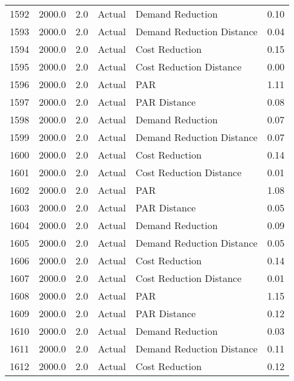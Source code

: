 \begin{longtable}{lrrllr}
1592 &       2000.0 &     2.0 &         Actual &           Demand Reduction &   0.10 \\
1593 &       2000.0 &     2.0 &         Actual &  Demand Reduction Distance &   0.04 \\
1594 &       2000.0 &     2.0 &         Actual &             Cost Reduction &   0.15 \\
1595 &       2000.0 &     2.0 &         Actual &    Cost Reduction Distance &   0.00 \\
1596 &       2000.0 &     2.0 &         Actual &                        PAR &   1.11 \\
1597 &       2000.0 &     2.0 &         Actual &               PAR Distance &   0.08 \\
1598 &       2000.0 &     2.0 &         Actual &           Demand Reduction &   0.07 \\
1599 &       2000.0 &     2.0 &         Actual &  Demand Reduction Distance &   0.07 \\
1600 &       2000.0 &     2.0 &         Actual &             Cost Reduction &   0.14 \\
1601 &       2000.0 &     2.0 &         Actual &    Cost Reduction Distance &   0.01 \\
1602 &       2000.0 &     2.0 &         Actual &                        PAR &   1.08 \\
1603 &       2000.0 &     2.0 &         Actual &               PAR Distance &   0.05 \\
1604 &       2000.0 &     2.0 &         Actual &           Demand Reduction &   0.09 \\
1605 &       2000.0 &     2.0 &         Actual &  Demand Reduction Distance &   0.05 \\
1606 &       2000.0 &     2.0 &         Actual &             Cost Reduction &   0.14 \\
1607 &       2000.0 &     2.0 &         Actual &    Cost Reduction Distance &   0.01 \\
1608 &       2000.0 &     2.0 &         Actual &                        PAR &   1.15 \\
1609 &       2000.0 &     2.0 &         Actual &               PAR Distance &   0.12 \\
1610 &       2000.0 &     2.0 &         Actual &           Demand Reduction &   0.03 \\
1611 &       2000.0 &     2.0 &         Actual &  Demand Reduction Distance &   0.11 \\
1612 &       2000.0 &     2.0 &         Actual &             Cost Reduction &   0.12 \\

\end{longtable}
